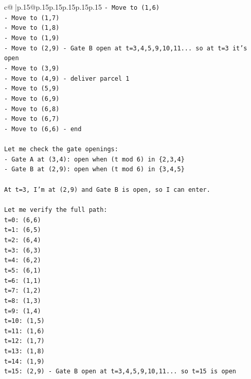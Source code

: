 \documentclass{article}
\begin{document}
{\begin{supertabular}{c@{$\;$}|p{.15\linewidth}@{}p{.15\linewidth}p{.15\linewidth}p{.15\linewidth}p{.15\linewidth}p{.15\linewidth}}
{{{\texttt{{-} Move to (1,6)} \\
\texttt{{-} Move to (1,7)} \\
\texttt{{-} Move to (1,8)} \\
\texttt{{-} Move to (1,9)} \\
\texttt{{-} Move to (2,9) {-} Gate B open at t=3,4,5,9,10,11... so at t=3 it's open} \\
\texttt{{-} Move to (3,9)} \\
\texttt{{-} Move to (4,9) {-} deliver parcel 1} \\
\texttt{{-} Move to (5,9)} \\
\texttt{{-} Move to (6,9)} \\
\texttt{{-} Move to (6,8)} \\
\texttt{{-} Move to (6,7)} \\
\texttt{{-} Move to (6,6) {-} end} \\
\\ 
\texttt{Let me check the gate openings:} \\
\texttt{{-} Gate A at (3,4): open when (t mod 6) in \{2,3,4\}} \\
\texttt{{-} Gate B at (2,9): open when (t mod 6) in \{3,4,5\}} \\
\\ 
\texttt{At t=3, I'm at (2,9) and Gate B is open, so I can enter.} \\
\\ 
\texttt{Let me verify the full path:} \\
\texttt{t=0: (6,6)} \\
\texttt{t=1: (6,5)} \\
\texttt{t=2: (6,4)} \\
\texttt{t=3: (6,3)} \\
\texttt{t=4: (6,2)} \\
\texttt{t=5: (6,1)} \\
\texttt{t=6: (1,1)} \\
\texttt{t=7: (1,2)} \\
\texttt{t=8: (1,3)} \\
\texttt{t=9: (1,4)} \\
\texttt{t=10: (1,5)} \\
\texttt{t=11: (1,6)} \\
\texttt{t=12: (1,7)} \\
\texttt{t=13: (1,8)} \\
\texttt{t=14: (1,9)} \\
\texttt{t=15: (2,9) {-} Gate B open at t=3,4,5,9,10,11... so t=15 is open} \\
}}}
\end{supertabular}}
\end{document}

